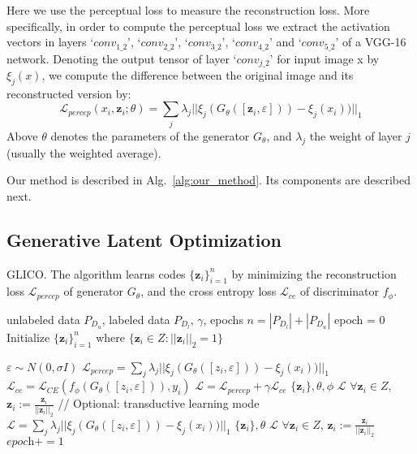 \documentclass[a4paper,conference]{IEEEtran}
\newcommand{\bz}{{\mathbf z}}
\begin{document}
Here we use the perceptual loss \cite{johnson2016perceptual} to measure the reconstruction loss. More specifically, in order to compute the perceptual loss we extract the activation vectors in layers ‘$conv_{1\_2}$’, ‘$conv_{2\_2}$’, ‘$conv_{3\_2}$’, ‘$conv_{4\_2}$’ and ‘$conv_{5\_2}$’ of a VGG-16 network. Denoting the output tensor of layer ‘$conv_{j\_2}$’ for input image x by $\xi_j(x)$, we compute the difference between the original image and its reconstructed version by:
\begin{equation}
	\label{eq: percep}
	\mathcal{L}_{\textit{percep}}(x_i,\bz_i;\theta) = \sum_j \lambda_j ||\xi_j(G_\theta([\bz_i, \varepsilon]))-\xi_j(x_i))||_1  
\end{equation}
Above $\theta$ denotes the parameters of the generator $G_\theta$, and $\lambda_j$ the weight of layer $j$ (usually the weighted average).

Our method is described in Alg.~\ref{alg:our_method}. Its components are described next.
\subsection{Generative Latent Optimization}
\label{sec:glo}


	
\begin{algorithm}[bt]
	\caption{GLICO. The algorithm learns codes $\{\bz_i\}_{i=1}^n$ by minimizing the reconstruction loss $\mathcal{L}_{\textit{percep}}$ of generator $G_\theta$, and the cross entropy loss $\mathcal{L}_{\textit{ce}}$ of discriminator $f_\phi$.}
	\label{alg:our_method}
	\begin{algorithmic}
		 unlabeled data $P_{D_u}$, labeled data $P_{D_l}$, $\gamma$, epochs
		\STATE $n = |P_{D_l}|+ |P_{D_u}|$
		\STATE epoch = 0
		\STATE Initialize $\{\bz_i\}_{i=1}^n$ where $\{\bz_i\in Z: ||\bz_i||_2 =1 \}$
		\REPEAT
														        
		\STATE $\varepsilon \sim N(0,\sigma I)$
		\STATE $\mathcal{L}_{\textit{percep}} =\sum_j \lambda_j ||\xi_j(G_\theta([z_i,\varepsilon]))-\xi_j(x_i))||_1$
		\STATE $\mathcal{L}_{\textit{ce}} = \mathcal{L}_{CE}(f_{\phi}(G_\theta([z_i,\varepsilon])),y_i)$
		\STATE $\mathcal{L}= \mathcal{L}_{\textit{percep}} + \gamma \mathcal{L}_{\textit{ce}} $
		\STATE {} $\{\bz_i\}, \theta, \phi$
		 $\mathcal{L}$
		\STATE   $\forall \bz_i \in Z$, $\bz_i:= \frac{\bz_i}{||\bz_i||_2} $
		\ENDFOR
		\STATE // Optional: transductive learning mode
		\STATE $\mathcal{L} =\sum_j \lambda_j ||\xi_j(G_\theta([z_i,\varepsilon]))-\xi_j(x_i))||_1$
		\STATE {} $\{\bz_i\}, \theta$   $\mathcal{L}$
		\STATE   $\forall \bz_i \in Z$, $\bz_i:= \frac{\bz_i}{||\bz_i||_2} $
		\ENDFOR
		\STATE $\textit{epoch} += 1$
	\end{algorithmic}
\end{algorithm}
\end{document}
